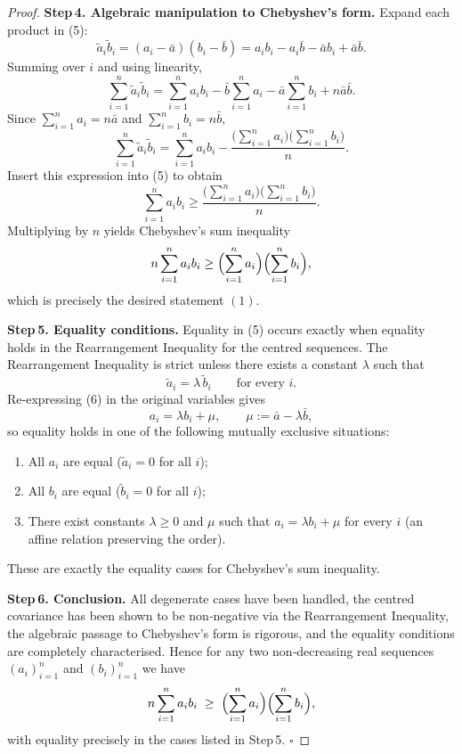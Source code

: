 \begin{proof}
\textbf{Step 4. Algebraic manipulation to Chebyshev’s form.}  
Expand each product in (5):
\[
\tilde a_{i}\tilde b_{i}
   =(a_{i}-\bar a)(b_{i}-\bar b)
   =a_{i}b_{i}-a_{i}\bar b-\bar a b_{i}+\bar a\bar b.
\]
Summing over \(i\) and using linearity,
\[
\sum_{i=1}^{n}\tilde a_{i}\tilde b_{i}
   =\sum_{i=1}^{n}a_{i}b_{i}
    -\bar b\sum_{i=1}^{n}a_{i}
    -\bar a\sum_{i=1}^{n}b_{i}
    +n\bar a\bar b.
\]
Since \(\sum_{i=1}^{n}a_{i}=n\bar a\) and \(\sum_{i=1}^{n}b_{i}=n\bar b\),
\[
\sum_{i=1}^{n}\tilde a_{i}\tilde b_{i}
   =\sum_{i=1}^{n}a_{i}b_{i}
    -\frac{\bigl(\sum_{i=1}^{n}a_{i}\bigr)\bigl(\sum_{i=1}^{n}b_{i}\bigr)}{n}.
\]
Insert this expression into (5) to obtain
\[
\sum_{i=1}^{n}a_{i}b_{i}
   \ge\frac{\bigl(\sum_{i=1}^{n}a_{i}\bigr)\bigl(\sum_{i=1}^{n}b_{i}\bigr)}{n}.
\]
Multiplying by \(n\) yields Chebyshev’s sum inequality
\[
n\sum_{i=1}^{n}a_{i}b_{i}
   \ge\Bigl(\sum_{i=1}^{n}a_{i}\Bigr)\Bigl(\sum_{i=1}^{n}b_{i}\Bigr),
\]
which is precisely the desired statement \((1)\).

\textbf{Step 5. Equality conditions.}  
Equality in (5) occurs exactly when equality holds in the Rearrangement
Inequality for the centred sequences.  The Rearrangement Inequality is strict
unless there exists a constant \(\lambda\) such that
\[
\tilde a_{i}= \lambda\,\tilde b_{i}\qquad\text{for every }i. \tag{6}
\]
Re‑expressing (6) in the original variables gives
\[
a_{i}= \lambda b_{i}+\mu,\qquad
\mu:=\bar a-\lambda\bar b, \tag{7}
\]
so equality holds in one of the following mutually exclusive situations:
\begin{enumerate}
\item All \(a_{i}\) are equal (\(\tilde a_{i}=0\) for all \(i\));
\item All \(b_{i}\) are equal (\(\tilde b_{i}=0\) for all \(i\));
\item There exist constants \(\lambda\ge0\) and \(\mu\) such that
      \(a_{i}= \lambda b_{i}+\mu\) for every \(i\) (an affine relation preserving the order).
\end{enumerate}
These are exactly the equality cases for Chebyshev’s sum inequality.

\textbf{Step 6. Conclusion.}  
All degenerate cases have been handled, the centred covariance has been shown
to be non‑negative via the Rearrangement Inequality, the algebraic passage to
Chebyshev’s form is rigorous, and the equality conditions are completely
characterised.  Hence for any two non‑decreasing real sequences
\((a_i)_{i=1}^{n}\) and \((b_i)_{i=1}^{n}\) we have
\[
n\sum_{i=1}^{n}a_{i}b_{i}\;\ge\;
\Bigl(\sum_{i=1}^{n}a_{i}\Bigr)\Bigl(\sum_{i=1}^{n}b_{i}\Bigr),
\]
with equality precisely in the cases listed in Step 5. \(\square\)
\end{proof}